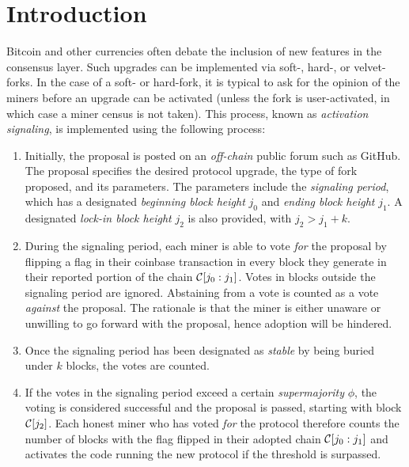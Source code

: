 \section{Introduction}
Bitcoin and other currencies often debate the inclusion of new features in the
consensus layer. Such upgrades can be implemented via soft-, hard-, or
velvet-forks. In the case of a soft- or hard-fork, it is typical to ask for
the opinion of the miners before an upgrade can be activated (unless the
fork is user-activated, in which case a miner census is not taken). This
process, known as \emph{activation signaling}, is implemented using the
following process:

\begin{enumerate}
  \item Initially, the proposal is posted on an \emph{off-chain} public forum
        such as GitHub. The proposal specifies the desired protocol upgrade, the
        type of fork proposed, and its parameters. The parameters include the
        \emph{signaling period}, which has a designated \emph{beginning block
        height} $j_0$ and \emph{ending block height} $j_1$. A designated
        \emph{lock-in block height} $j_2$ is also provided, with
        $j_2 > j_1 + k$.
  \item During the signaling period, each miner is able to vote \emph{for}  the
        proposal by flipping a flag in their coinbase transaction in every block
        they generate in their reported portion of the chain $\mathcal{C}[j_0:j_1]$.
        Votes in blocks outside the signaling period are ignored. Abstaining
        from a vote is counted as a vote \emph{against} the proposal. The
        rationale is that the miner is either unaware or unwilling to go forward
        with the proposal, hence adoption will be hindered.
  \item Once the signaling period has been designated as \emph{stable} by being
        buried under $k$ blocks, the votes are counted.
  \item If the votes in the signaling period exceed a certain
        \emph{supermajority} $\phi$, the voting is considered successful and the
        proposal is passed, starting with block $\mathcal{C}[j_2]$. Each honest miner
        who has voted \emph{for} the protocol therefore counts the number of
        blocks with the flag flipped in their adopted chain $\mathcal{C}[j_0:j_1]$
        and activates the code running the new protocol if the threshold is
        surpassed.
\end{enumerate}

